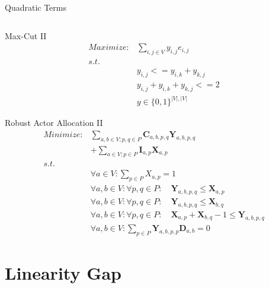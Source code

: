 \documentclass{beamer}
\begin{document}
\begin{frame}{Quadratic Terms}
\begin{columns}
\begin{column}{5cm}
\end{column}
\begin{column}{5cm}
\end{column}
\end{columns}
\end{frame}

\begin{frame}{Max-Cut II}
\begin{align}
	\nonumber Maximize: & \sum_{i,j \in V}{y_{i,j}e_{i,j}} \\
	\nonumber s.t. & \\
	\nonumber & y_{i,j} <= y_{i,k} + y_{k,j} \\
	\nonumber & y_{i,j} + y_{i,k} + y_{k,j} <= 2 \\
	\nonumber & y \in \{0,1\}^{|V|, |V|}
\end{align}
\end{frame}

\begin{frame}{Robust Actor Allocation II}
\begin{align}
	\nonumber Minimize: & \sum_{a,b \in V; p,q \in P} \mathbf{C}_{a,b,p,q}\mathbf{Y}_{a,b,p,q} \\
	\nonumber & + \sum_{a \in V; p \in P} \mathbf{I}_{a,p}\mathbf{X}_{a,p} \\
	\nonumber s.t. &  \\
	\nonumber & \forall a \in V : \sum_{p \in P}X_{a,p} = 1 \\
	\nonumber & \forall a,b \in V : \forall p,q \in P : \quad \mathbf{Y}_{a,b,p,q} \leq \mathbf{X}_{a,p} \\
	\nonumber & \forall a,b \in V : \forall p,q \in P : \quad \mathbf{Y}_{a,b,p,q} \leq \mathbf{X}_{b,q} \\
	\nonumber & \forall a,b \in V : \forall p,q \in P : \quad \mathbf{X}_{a,p} + \mathbf{X}_{b,q} - 1 \leq \mathbf{Y}_{a,b,p,q} \\
	\nonumber & \forall a,b \in V : \sum_{p \in P}\mathbf{Y}_{a,b,p,p}\mathbf{D}_{a,b} = 0
\end{align}
\end{frame}

\section{Linearity Gap}
\end{document}
